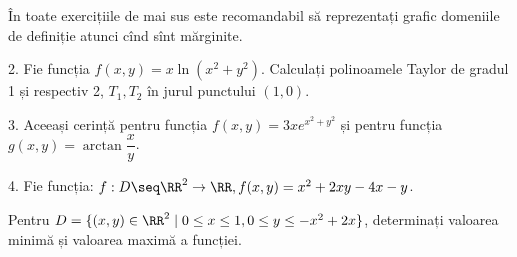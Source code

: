În toate exercițiile de mai sus este recomandabil să reprezentați
grafic domeniile de definiție atunci cînd sînt mărginite.

\vspace{0.3cm}

2. Fie funcția $ f(x,y) = x \ln(x^2 + y^2) $. Calculați polinoamele Taylor
de gradul 1 și respectiv 2, $ T_1, T_2 $ în jurul punctului $ (1, 0) $.

\vspace{0.3cm}

3. Aceeași cerință pentru funcția $ f(x, y) = 3xe^{x^2 + y^2} $ și pentru
funcția $ g(x, y) = \arctan \dfrac{x}{y} $.

\vspace{0.3cm}

4. Fie funcția: $ f : D \seq \RR^2 \to \RR, f(x, y) = x^2 + 2xy - 4x - y $.

Pentru $ D = \{ (x, y) \in \RR^2 \mid 0 \leq x \leq 1, 0 \leq y \leq -x^2 + 2x \} $,
determinați valoarea minimă și valoarea maximă a funcției.

